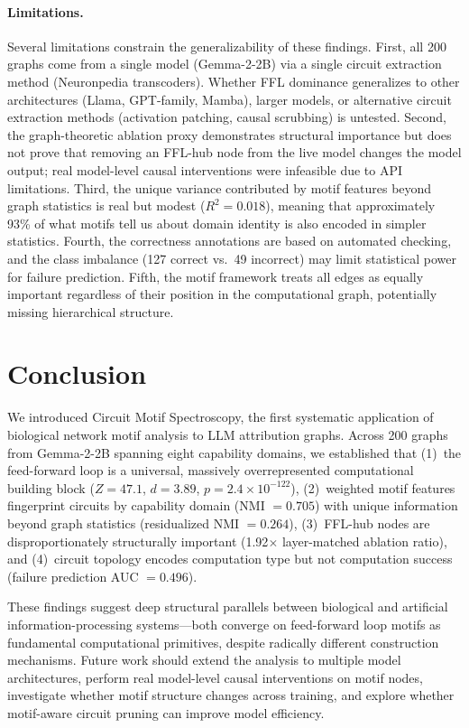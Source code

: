 \documentclass[11pt,letterpaper]{article}
\begin{document}
\paragraph{Limitations.}
Several limitations constrain the generalizability of these findings. First, all 200 graphs come from a single model (Gemma-2-2B) via a single circuit extraction method (Neuronpedia transcoders). Whether FFL dominance generalizes to other architectures (Llama, GPT-family, Mamba), larger models, or alternative circuit extraction methods (activation patching, causal scrubbing) is untested. Second, the graph-theoretic ablation proxy demonstrates structural importance but does not prove that removing an FFL-hub node from the live model changes the model output; real model-level causal interventions were infeasible due to API limitations. Third, the unique variance contributed by motif features beyond graph statistics is real but modest ($R^2 = 0.018$), meaning that approximately 93\% of what motifs tell us about domain identity is also encoded in simpler statistics. Fourth, the correctness annotations are based on automated checking, and the class imbalance (127 correct vs.\ 49 incorrect) may limit statistical power for failure prediction. Fifth, the motif framework treats all edges as equally important regardless of their position in the computational graph, potentially missing hierarchical structure.

\section{Conclusion}
\label{sec:conclusion}

We introduced Circuit Motif Spectroscopy, the first systematic application of biological network motif analysis to LLM attribution graphs. Across 200 graphs from Gemma-2-2B spanning eight capability domains, we established that (1)~the feed-forward loop is a universal, massively overrepresented computational building block ($Z = 47.1$, $d = 3.89$, $p = 2.4 \times 10^{-122}$), (2)~weighted motif features fingerprint circuits by capability domain (NMI $= 0.705$) with unique information beyond graph statistics (residualized NMI $= 0.264$), (3)~FFL-hub nodes are disproportionately structurally important (1.92$\times$ layer-matched ablation ratio), and (4)~circuit topology encodes computation type but not computation success (failure prediction AUC $= 0.496$).

These findings suggest deep structural parallels between biological and artificial information-processing systems---both converge on feed-forward loop motifs as fundamental computational primitives, despite radically different construction mechanisms. Future work should extend the analysis to multiple model architectures, perform real model-level causal interventions on motif nodes, investigate whether motif structure changes across training, and explore whether motif-aware circuit pruning can improve model efficiency.


\end{document}
